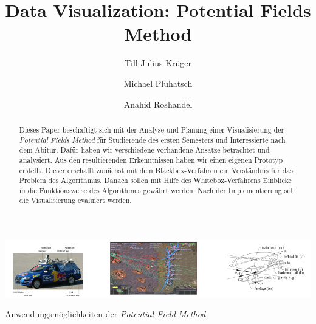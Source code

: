 \documentclass[sigchi, review]{acmart}
\begin{document}
\title{Data Visualization: Potential Fields Method}

 \author[Krüger]{Till-Julius Krüger}
 \email{}

 \author[Pluhatsch]{Michael Pluhatsch}
 \email{}

 \author[Roshandel]{Anahid Roshandel}
 \email{}



\begin{abstract}
Dieses Paper beschäftigt sich mit der Analyse und Planung einer Visualisierung der \textit{Potential Fields Method} für Studierende des ersten Semesters und Interessierte nach dem Abitur. Dafür haben wir  verschiedene vorhandene Ansätze betrachtet und analysiert. Aus den resultierenden Erkenntnissen haben wir einen eigenen Prototyp erstellt. Dieser erschafft zunächst mit dem Blackbox-Verfahren ein Verständnis für das Problem des Algorithmus. Danach sollen mit Hilfe des Whitebox-Verfahrens Einblicke in die Funktionsweise des Algorithmus gewährt werden. Nach der Implementierung soll die Visualisierung evaluiert werden.
\end{abstract}



\begin{teaserfigure}
  \includegraphics[width=\textwidth]{img/teaser}
  \caption{Anwendungsmöglichkeiten der \textit{Potential Field Method}~\cite{hagelback2012potential}\cite{montemerlo2008junior}\cite{paul2008uav}}
  \label{fig:teaser}
\end{teaserfigure}


\maketitle





%

\end{document}
